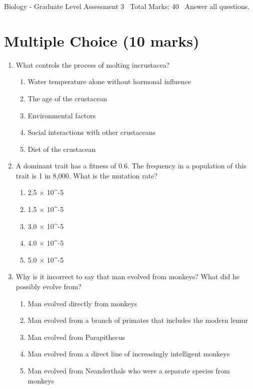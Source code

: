 \documentclass[12pt]{article}
\begin{document}
\begin{center}
Biology - Graduate Level Assessment 3 \
Total Marks: 40 \
Answer all questions.
\end{center}

\section*{Multiple Choice (10 marks)}
\begin{enumerate}[label=\arabic*.]
\item What controls the process of molting incrustacea?
\begin{enumerate}[label=(\alph*)]
    \item Water temperature alone without hormonal influence
    \item The age of the crustacean
    \item Environmental factors
    \item Social interactions with other crustaceans
    \item Diet of the crustacean
\end{enumerate}
\item A dominant trait has a fitness of 0.6. The frequency in a population of this trait is 1 in 8,000. What is the mutation rate?
\begin{enumerate}[label=(\alph*)]
    \item 2.5 \ensuremath{\times} 10^-5
    \item 1.5 \ensuremath{\times} 10^-5
    \item 3.0 \ensuremath{\times} 10^-5
    \item 4.0 \ensuremath{\times} 10^-5
    \item 5.0 \ensuremath{\times} 10^-5
\end{enumerate}
\item Why is it incorrect to say that man evolved from monkeys? What did he possibly evolve from?
\begin{enumerate}[label=(\alph*)]
    \item Man evolved directly from monkeys
    \item Man evolved from a branch of primates that includes the modern lemur
    \item Man evolved from Parapithecus
    \item Man evolved from a direct line of increasingly intelligent monkeys
    \item Man evolved from Neanderthals who were a separate species from monkeys
\end{enumerate}

\end{enumerate}
\end{document}
